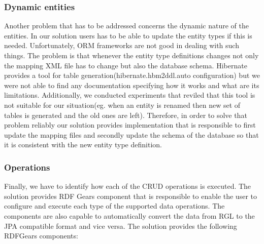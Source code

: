\subsubsection{Dynamic entities}

Another problem that has to be addressed concerns the dynamic nature of the entities. In our solution users has to be able to update the entity types if this is needed. Unfortunately, ORM frameworks are not good in dealing with such things. The problem is that whenever the entity type definitions changes not only the mapping XML file has to change but also the database schema. Hibernate provides a tool for table generation(hibernate.hbm2ddl.auto configuration) but we were not able to find any documentation specifying how it works and what are its limitations. Additionally, we conducted experiments that reviled that this tool is not suitable for our situation(eg. when an entity is renamed then new set of tables is generated and the old ones are left). Therefore, in order to solve that problem reliably our solution provides implementation that is responsible to first update the mapping files and secondly update the schema of the database so that it is consistent with the new entity type definition.


\subsubsection{Operations}
Finally, we have to identify how each of the CRUD operations is executed. The solution provides RDF Gears component that is responsible to enable the user to configure and execute each type of the supported data operations. The components are also capable to automatically convert the data from RGL to the JPA compatible format and vice versa. The solution provides the following RDFGears components:

